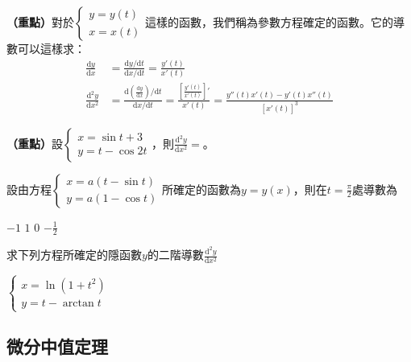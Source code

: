 \documentclass[12pt, addpoints]{exam}
\def \important{\textbf{（重點）}}
\def \d{\mathrm{d}}
\begin{document}
\begin{questions}

\question
\important 對於$\displaystyle \begin{cases}
y=y(t)\\
x=x(t) 
\end{cases}$這樣的函數，我們稱為參數方程確定的函數。它的導數可以這樣求：
\begin{align*}
    \frac{\d y}{\d x} &= \frac{\d y / \d t}{\d x / \d t}=\frac{y'(t)}{x'(t)}\\
    \frac{\d^2 y}{\d x^2} &= \frac{\d \left( \frac{\d y}{\d x} \right) / \d t}{\d x / \d t}=\frac{\left[ 
\frac{y'(t)}{x'(t)} \right]'}{x'(t)}=\frac{y''(t)x'(t)-y'(t)x''(t)}{[x'(t)]^3}
\end{align*}

\question[1]
\important 設$\begin{cases}
x=\sin t+3\\
y=t-\cos 2t
\end{cases}$，則$\displaystyle \frac{\d ^2 y}{\d x^2}=$\fillin[Black]。

\question[1]
設由方程$\begin{cases}
x=a(t-\sin t)\\
y=a(1-\cos t)
\end{cases}$所確定的函數為$y=y(x)$，則在$\displaystyle t=\frac{\pi}{2}$處導數為
\begin{choices}
    \choice $-1$
    \choice $1$
    \choice $0$
    \choice $\displaystyle -\frac{1}{2}$
\end{choices}

\question[1]
求下列方程所確定的隱函數$y$的二階導數$\displaystyle \frac{\d^2 y}{\d x^2}$

$\begin{cases}
x=\ln(1+t^2)\\
y=t-\arctan t
\end{cases}$

\end{questions}

\newpage %

\subsection{微分中值定理}
\end{document}
